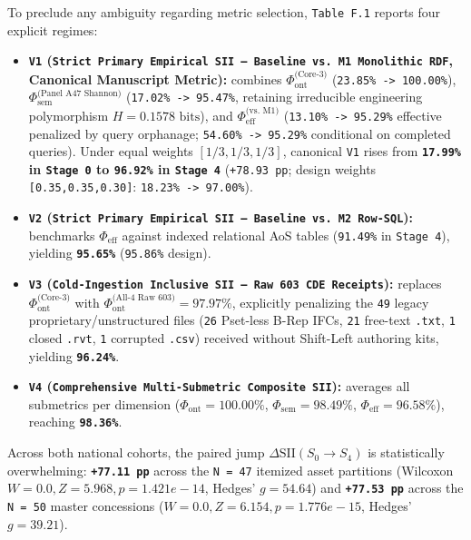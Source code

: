 \documentclass[10pt,a4paper]{article}
\begin{document}
To preclude any ambiguity regarding metric selection, \texttt{Table F.1} reports four explicit regimes:
\begin{itemize}
  \item \textbf{\texttt{V1} (\texttt{Strict Primary Empirical SII --- Baseline vs. M1 Monolithic RDF}, Canonical Manuscript Metric):} combines $\Phi_{\text{ont}}^{\text{(Core-3)}}$ (\texttt{23.85\% -> 100.00\%}), $\Phi_{\text{sem}}^{\text{(Panel A47 Shannon)}}$ (\texttt{17.02\% -> 95.47\%}, retaining irreducible engineering polymorphism $H = 0.1578\text{ bits}$), and $\Phi_{\text{eff}}^{\text{(vs. M1)}}$ (\texttt{13.10\% -> 95.29\%} effective penalized by query orphanage; \texttt{54.60\% -> 95.29\%} conditional on completed queries). Under equal weights $[1/3,1/3,1/3]$, canonical \texttt{V1} rises from \textbf{\texttt{17.99\%} in \texttt{Stage 0} to \texttt{96.92\%} in \texttt{Stage 4}} (\texttt{+78.93 pp}; design weights \texttt{[0.35,0.35,0.30]}: \texttt{18.23\% -> 97.00\%}).
  \item \textbf{\texttt{V2} (\texttt{Strict Primary Empirical SII --- Baseline vs. M2 Row-SQL}):} benchmarks $\Phi_{\text{eff}}$ against indexed relational AoS tables (\texttt{91.49\%} in \texttt{Stage 4}), yielding \textbf{\texttt{95.65\%}} (\texttt{95.86\%} design).
  \item \textbf{\texttt{V3} (\texttt{Cold-Ingestion Inclusive SII --- Raw 603 CDE Receipts}):} replaces $\Phi_{\text{ont}}^{\text{(Core-3)}}$ with $\Phi_{\text{ont}}^{\text{(All-4 Raw 603)}} = 97.97\%$, explicitly penalizing the \texttt{49} legacy proprietary/unstructured files (\texttt{26} Pset-less B-Rep IFCs, \texttt{21} free-text \texttt{.txt}, \texttt{1} closed \texttt{.rvt}, \texttt{1} corrupted \texttt{.csv}) received without Shift-Left authoring kits, yielding \textbf{\texttt{96.24\%}}.
  \item \textbf{\texttt{V4} (\texttt{Comprehensive Multi-Submetric Composite SII}):} averages all submetrics per dimension ($\Phi_{\text{ont}} = 100.00\%$, $\Phi_{\text{sem}} = 98.49\%$, $\Phi_{\text{eff}} = 96.58\%$), reaching \textbf{\texttt{98.36\%}}.
\end{itemize}

Across both national cohorts, the paired jump $\Delta\text{SII}(S_0 \to S_4)$ is statistically overwhelming: \textbf{\texttt{+77.11 pp}} across the \texttt{N = 47} itemized asset partitions (Wilcoxon $W = 0.0, Z = 5.968, p = 1.421e-14$, Hedges' $g = 54.64$) and \textbf{\texttt{+77.53 pp}} across the \texttt{N = 50} master concessions ($W = 0.0, Z = 6.154, p = 1.776e-15$, Hedges' $g = 39.21$).
\end{document}

